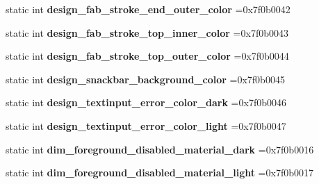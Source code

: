 \begin{DoxyCompactItemize}
static int {\bfseries design\+\_\+fab\+\_\+stroke\+\_\+end\+\_\+outer\+\_\+color} =0x7f0b0042
\item 
\mbox{\label{classandroid_1_1support_1_1v7_1_1mediarouter_1_1R_1_1color_a3b5d7609b2dbaea2371efbbf80100b89}} 
static int {\bfseries design\+\_\+fab\+\_\+stroke\+\_\+top\+\_\+inner\+\_\+color} =0x7f0b0043
\item 
\mbox{\label{classandroid_1_1support_1_1v7_1_1mediarouter_1_1R_1_1color_ace0c4222c66e9f015264c8eb11215787}} 
static int {\bfseries design\+\_\+fab\+\_\+stroke\+\_\+top\+\_\+outer\+\_\+color} =0x7f0b0044
\item 
\mbox{\label{classandroid_1_1support_1_1v7_1_1mediarouter_1_1R_1_1color_af3a0390a925878f1128a23bcd81073f3}} 
static int {\bfseries design\+\_\+snackbar\+\_\+background\+\_\+color} =0x7f0b0045
\item 
\mbox{\label{classandroid_1_1support_1_1v7_1_1mediarouter_1_1R_1_1color_a1607b16f727189a4d3aadec15076c5b2}} 
static int {\bfseries design\+\_\+textinput\+\_\+error\+\_\+color\+\_\+dark} =0x7f0b0046
\item 
\mbox{\label{classandroid_1_1support_1_1v7_1_1mediarouter_1_1R_1_1color_aa2e36e178d3a629805522feb95d3a448}} 
static int {\bfseries design\+\_\+textinput\+\_\+error\+\_\+color\+\_\+light} =0x7f0b0047
\item 
\mbox{\label{classandroid_1_1support_1_1v7_1_1mediarouter_1_1R_1_1color_ae02d4659100b31ac5beba1db007141e3}} 
static int {\bfseries dim\+\_\+foreground\+\_\+disabled\+\_\+material\+\_\+dark} =0x7f0b0016
\item 
\mbox{\label{classandroid_1_1support_1_1v7_1_1mediarouter_1_1R_1_1color_a217dc47eff954618266e2deb5178b0cc}} 
static int {\bfseries dim\+\_\+foreground\+\_\+disabled\+\_\+material\+\_\+light} =0x7f0b0017
\item 

\end{DoxyCompactItemize}
